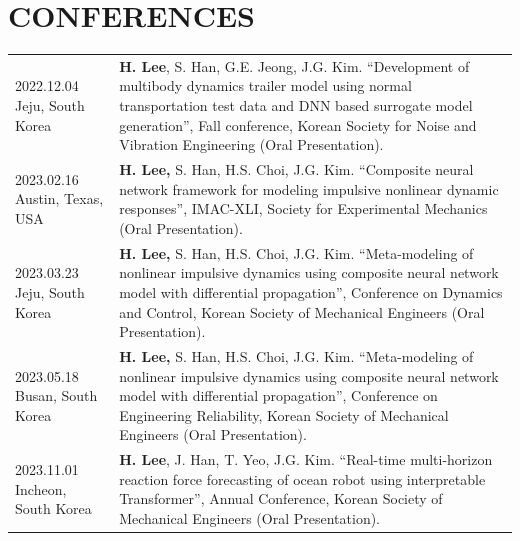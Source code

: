 \documentclass[a4paper,10pt]{extarticle}
\begin{document}
\section*{CONFERENCES}
\noindent
{}
\vspace*{-.5cm}
\begin{longtable}{LR}
    {2022.12.04 \linebreak Jeju, South Korea}    & \textbf{H. Lee}, S. Han, G.E. Jeong, J.G. Kim. “Development of multibody dynamics trailer model using normal transportation test data and DNN based surrogate model generation”, Fall conference, Korean Society for Noise and Vibration Engineering (Oral Presentation). \\
    {2023.02.16 \linebreak  Austin, Texas, USA}  & \textbf{H. Lee,} S. Han, H.S. Choi, J.G. Kim. “Composite neural network framework for modeling impulsive nonlinear dynamic responses”, IMAC-XLI, Society for Experimental Mechanics (Oral Presentation).                                                                  \\
    {2023.03.23 \linebreak Jeju, South Korea}    & \textbf{H. Lee,} S. Han, H.S. Choi, J.G. Kim. “Meta-modeling of nonlinear impulsive dynamics using composite neural network model with differential propagation”, Conference on Dynamics and Control, Korean Society of Mechanical Engineers (Oral Presentation).         \\
    {2023.05.18 \linebreak Busan, South Korea}   & \textbf{H. Lee,} S. Han, H.S. Choi, J.G. Kim. “Meta-modeling of nonlinear impulsive dynamics using composite neural network model with differential propagation”, Conference on Engineering Reliability, Korean Society of Mechanical Engineers (Oral Presentation).      \\
    {2023.11.01 \linebreak Incheon, South Korea} & \textbf{H. Lee}, J. Han, T. Yeo, J.G. Kim. “Real-time multi-horizon reaction force forecasting of ocean robot using interpretable Transformer”, Annual Conference, Korean Society of Mechanical Engineers (Oral Presentation).                                            \\
\end{longtable}


\end{document}
